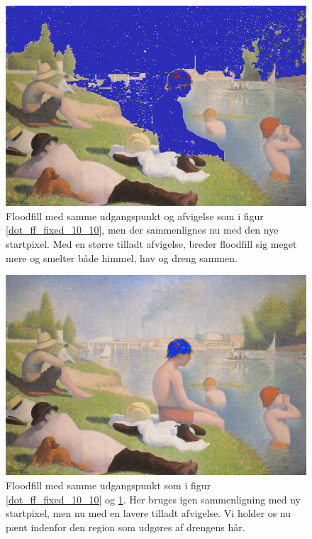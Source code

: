 {\begin{figure}[!h]
    \begin{center}
        \includegraphics[scale=0.49]{afsnit/vores_implementation/billeder/flood_fill/dot_ff_var_10_10}
    \end{center}
    \caption[]{Floodfill med samme udgangspunkt og afvigelse som i figur
    \ref{dot_ff_fixed_10_10}, men der sammenlignes nu med den nye
    startpixel. Med en større tilladt afvigelse, breder floodfill sig
    meget mere og smelter både himmel, hav og dreng sammen.}
    \label{dot_ff_var_10_10}
\end{figure}

\begin{figure}[!h]
    \begin{center}
        \includegraphics[scale=0.49]{afsnit/vores_implementation/billeder/flood_fill/dot_ff_var_9_9}
    \end{center}
    \caption[]{Floodfill med samme udgangspunkt som i figur
    \ref{dot_ff_fixed_10_10} og \ref{dot_ff_var_10_10}. Her bruges
    igen sammenligning med ny startpixel, men nu med en lavere tilladt
    afvigelse. Vi holder os nu pænt indenfor den region som udgøres af
    drengens hår.}
    \label{dot_ff_var_9_9}
\end{figure}

}
